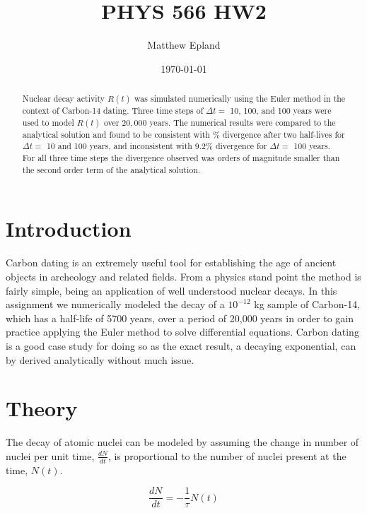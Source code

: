 \documentclass[notitlepage,aps,prd,nofootinbib]{revtex4-1}
\begin{document}
\title{PHYS 566 HW2}
\author{Matthew Epland}

\date{\today}

\begin{abstract}
Nuclear decay activity $R\left(t\right)$ was simulated numerically using the Euler method in the context of Carbon-14 dating. Three time steps of $\Delta t =$ 10, 100, and 100 years were used to model $R\left(t\right)$ over $20,000$ years. The numerical results were compared to the analytical solution and found to be consistent with \% divergence after two half-lives for $\Delta t =$ 10 and 100 years, and inconsistent with 9.2\% divergence for $\Delta t =$ 100 years. For all three time steps the divergence observed was orders of magnitude smaller than the second order term of the analytical solution.
\end{abstract}\maketitle


\section{Introduction}
\label{sec:intro}
Carbon dating is an extremely useful tool for establishing the age of ancient objects in archeology and related fields. From a physics stand point the method is fairly simple, being an application of well understood nuclear decays. In this assignment we numerically modeled the decay of a $10^{-12}$ kg sample of Carbon-14, which has a half-life of 5700 years, over a period of 20,000 years in order to gain practice applying the Euler method to solve differential equations. Carbon dating is a good case study for doing so as the exact result, a decaying exponential, can by derived analytically without much issue.

\section{Theory}
\label{sec:theory}

The decay of atomic nuclei can be modeled by assuming the change in number of nuclei per unit time, $\frac{d N}{d t}$, is proportional to the number of nuclei present at the time, $N\left(t\right)$.

\begin{equation} \label{eq:deq}
\frac{d N}{d t} = -\frac{1}{\tau} N\left(t\right)
\end{equation}
\end{document}
